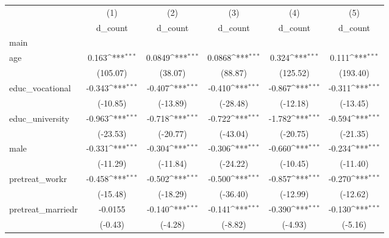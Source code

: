 {
\def\sym#1{\ifmmode^{#1}\else\(^{#1}\)\fi}
\begin{tabular}{l*{5}{c}}
\hline\hline
            &\multicolumn{1}{c}{(1)}&\multicolumn{1}{c}{(2)}&\multicolumn{1}{c}{(3)}&\multicolumn{1}{c}{(4)}&\multicolumn{1}{c}{(5)}\\
            &\multicolumn{1}{c}{d\_count}&\multicolumn{1}{c}{d\_count}&\multicolumn{1}{c}{d\_count}&\multicolumn{1}{c}{d\_count}&\multicolumn{1}{c}{d\_count}\\
\hline
main        &                     &                     &                     &                     &                     \\
age         &       0.163\sym{***}&      0.0849\sym{***}&      0.0868\sym{***}&       0.324\sym{***}&       0.111\sym{***}\\
            &    (105.07)         &     (38.07)         &     (88.87)         &    (125.52)         &    (193.40)         \\
[1em]
educ\_vocational&      -0.343\sym{***}&      -0.407\sym{***}&      -0.410\sym{***}&      -0.867\sym{***}&      -0.311\sym{***}\\
            &    (-10.85)         &    (-13.89)         &    (-28.48)         &    (-12.18)         &    (-13.45)         \\
[1em]
educ\_university&      -0.963\sym{***}&      -0.718\sym{***}&      -0.722\sym{***}&      -1.782\sym{***}&      -0.594\sym{***}\\
            &    (-23.53)         &    (-20.77)         &    (-43.04)         &    (-20.75)         &    (-21.35)         \\
[1em]
male        &      -0.331\sym{***}&      -0.304\sym{***}&      -0.306\sym{***}&      -0.660\sym{***}&      -0.234\sym{***}\\
            &    (-11.29)         &    (-11.84)         &    (-24.22)         &    (-10.45)         &    (-11.40)         \\
[1em]
pretreat\_workr&      -0.458\sym{***}&      -0.502\sym{***}&      -0.500\sym{***}&      -0.857\sym{***}&      -0.270\sym{***}\\
            &    (-15.48)         &    (-18.29)         &    (-36.40)         &    (-12.99)         &    (-12.62)         \\
[1em]
pretreat\_marriedr&     -0.0155         &      -0.140\sym{***}&      -0.141\sym{***}&      -0.390\sym{***}&      -0.130\sym{***}\\
            &     (-0.43)         &     (-4.28)         &     (-8.82)         &     (-4.93)         &     (-5.16)         \\

\end{tabular}}
